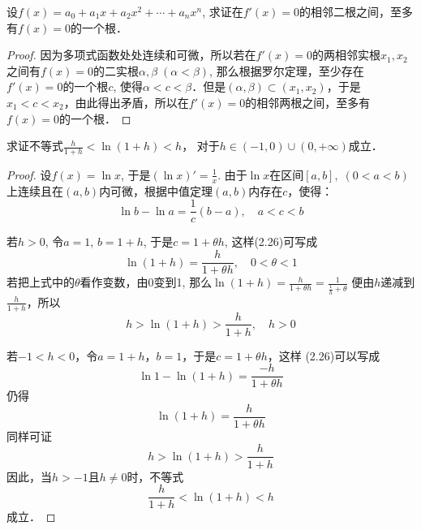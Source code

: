 \begin{example}
    设$f(x)=a_0+a_1x+a_2x^2+\cdots+a_nx^n$, 求证在$f'(x)=0$的相邻二根之间，至多有$f(x)=0$的一个根．   
\end{example}

\begin{proof}
因为多项式函数处处连续和可微，所以若在$f'(x)=0$的两相邻实根$x_1,x_2$之间有$f(x)=0$的二实根$\alpha,\beta\; (\alpha<\beta)$, 那么根据罗尔定理，至少存在$f'(x)=0$的一个根$c$, 使得$\alpha<c<\beta$．但是$(\alpha,\beta)\subset (x_1,x_2)$，于是$x_1<c<x_2$，由此得出矛盾，所以在$f'(x)=0$的相邻两根之间，至多有$f(x)=0$的一个根．
\end{proof}

\begin{example}
    求证不等式$\frac{h}{1+h}<\ln(1+h)<h$，
    对于$h\in (-1, 0)\cup (0,+\infty)$成立．
\end{example}


\begin{proof}
    设$f(x)=\ln x$, 于是$(\ln x)'=\frac{1}{x}$. 由于$\ln x$在区间$[a,b],\; (0<a<b)$上连续且在$(a,b)$内可微，根据中值定理$(a,b)$内存在$c$，使得：
\begin{equation}
    \ln b-\ln a=\frac{1}{c}(b-a),\quad a<c<b
\end{equation}

若$h>0$, 令$a=1$, $b=1+h$, 于是$c=1+\theta h$, 这样(2.26)可写成
\[\ln (1+h) =\frac{h}{1+\theta h},\quad 0<\theta<1\]
若把上式中的$\theta$看作变数，由0变到1, 那么$\ln(1+h)=\frac{h}{1+\theta h}=\frac{1}{\frac{1}{h}+\theta}$
便由$h$递减到$\frac{h}{1+h}$，所以
\[h>\ln(1+h)>\frac{h}{1+h},\quad h>0\]

若$-1<h<0$，令$a=1+h$，$b=1$，于是$c=1+\theta h$，这样
(2.26)可以写成
\[\ln1-\ln (1+h) =\frac{-h}{1+\theta h}\]
仍得
\[\ln (1+h) =\frac{h}{1+\theta h}\]
同样可证
\[h> \ln (1+h) >\frac{h}{1+h}\]
因此，当$h>-1$且$h\ne 0$时，不等式
\[\frac{h}{1+h}<\ln(1+h)<h\]
成立．
\end{proof}



